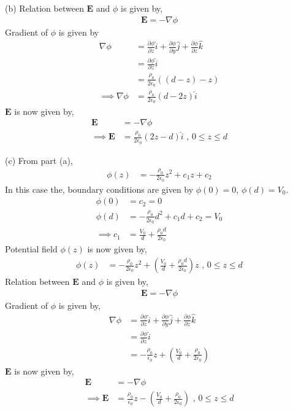\documentclass[12pt]{article}
\providecommand{\brak}[1]{\ensuremath{\left(#1\right)}}
\begin{document}
(b) Relation between $\mathbf{E}$ and $\phi$ is given by,
\begin{align*}
    \mathbf{E} = -\nabla \phi
\end{align*}
Gradient of $\phi$ is given by
\begin{align*}
    \nabla \phi &= \frac{\partial \phi}{\partial z} \hat{i} + \frac{\partial \phi}{\partial y} \hat{j} + \frac{\partial \phi}{\partial z} \hat{k}\\
    &= \frac{\partial \phi}{\partial z} \hat{i}\\
    &= \frac{\rho_0}{2\epsilon_0} \brak{\brak{d - z} - z}\\
    \implies \nabla \phi &= \frac{\rho_0}{2\epsilon_0}\brak{d - 2z} \hat{i}
\end{align*}
$\mathbf{E}$ is now given by,
\begin{align*}
    \mathbf{E} &= -\nabla \phi\\
    \implies \mathbf{E} &= \frac{\rho_0}{2\epsilon_0}\brak{2z - d} \hat{i} \text{ , } 0 \leq z \leq d
\end{align*}

(c) From part (a),
\begin{align*}
    \phi \brak{z} &= -\frac{\rho_0}{2\epsilon_0} z^2 + c_1 z + c_2
\end{align*}
In this case the, boundary conditions are given by $\phi\brak{0} = 0$, $\phi\brak{d} = V_0$.
\begin{align*}
    \phi\brak{0} &= c_2 = 0\\
    \phi\brak{d} &= -\frac{\rho_0}{2\epsilon_0} d^2 + c_1 d + c_2 = V_0\\
    \implies c_1 &= \frac{V_0}{d} + \frac{\rho_0 d}{2 \epsilon_0}
\end{align*}
Potential field $\phi\brak{z}$ is now given by,
\begin{align*}
    \phi \brak{z} &= -\frac{\rho_0}{2\epsilon_0} z^2 + \brak{\frac{V_0}{d} + \frac{\rho_0 d}{2 \epsilon_0}} z \text{ , } 0 \leq z \leq d
\end{align*}
Relation between $\mathbf{E}$ and $\phi$ is given by,
\begin{align*}
    \mathbf{E} = -\nabla \phi
\end{align*}
Gradient of $\phi$ is given by,
\begin{align*}
    \nabla \phi &= \frac{\partial \phi}{\partial z} \hat{i} + \frac{\partial \phi}{\partial y} \hat{j} + \frac{\partial \phi}{\partial z} \hat{k}\\
    &= \frac{\partial \phi}{\partial z} \hat{i}\\
    &= -\frac{\rho_0}{\epsilon_0} z + \brak{\frac{V_0}{d} + \frac{\rho_0}{2\epsilon_0}}
\end{align*}
$\mathbf{E}$ is now given by,
\begin{align*}
    \mathbf{E} &= -\nabla \phi\\
    \implies \mathbf{E} &= \frac{\rho_0}{\epsilon_0} z - \brak{\frac{V_0}{d} + \frac{\rho_0}{2\epsilon_0}} \text{ , } 0 \leq z \leq d
\end{align*}
\end{document}
